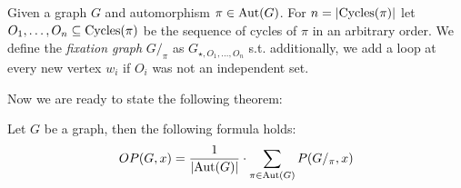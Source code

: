 \begin{defn}
    Given a graph $G$ and automorphism $\pi \in \operatorname{Aut}(G)$. For $n = \left|{\operatorname{Cycles}(\pi)}\right|$ let $O_1, \ldots ,O_n \subseteq \operatorname{Cycles}(\pi)$ be the sequence of cycles of $\pi$ in an arbitrary order. We define the \emph{fixation graph} $G /_{\pi}$ as $G_{\star,O_1, \ldots , O_n}$ s.t. additionally, we add a loop at every new vertex $w_i$ if $O_i$ was not an independent set.
\end{defn}

Now we are ready to state the following theorem:

\begin{thm} \label{thm:count-orb-chrompoly}
    Let $G$ be a graph, then the following formula holds:
    \begin{equation} \label{eqn:oribtal-chrompoly}
        OP(G,x) = \frac{1}{\left|{\operatorname{Aut}(G)}\right|} \cdot \sum_{\pi \in \operatorname{Aut}(G)}P(G/_\pi,x)
    \end{equation}
\end{thm}

